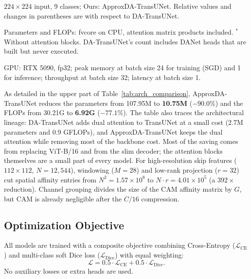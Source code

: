 \begin{table}[t]
\begin{tablenotes}
\item $224 \times 224$ input, 9 classes; Ours: ApproxDA-TransUNet. Relative values and changes in parentheses are with respect to DA-TransUNet.
\item Parameters and FLOPs: fvcore on CPU, attention matrix products included. $^{\ast}$Without attention blocks. DA-TransUNet's count includes DANet heads that are built but never executed.
\item GPU: RTX 5090, fp32; peak memory at batch size 24 for training (SGD) and 1 for inference; throughput at batch size 32; latency at batch size 1.
\end{tablenotes}
\end{table}

As detailed in the upper part of Table~\ref{tab:arch_comparison}, ApproxDA-TransUNet reduces the parameters from 107.95M to \textbf{10.75M} ($-90.0\%$) and the FLOPs from 30.21G to \textbf{6.92G} ($-77.1\%$). The table also traces the architectural lineage: DA-TransUNet adds dual attention to TransUNet at a small cost (2.7M parameters and 0.9 GFLOPs), and ApproxDA-TransUNet keeps the dual attention while removing most of the backbone cost. Most of the saving comes from replacing ViT-B/16 and from the slim decoder; the attention blocks themselves are a small part of every model. For high-resolution skip features ($112 \times 112$, $N = 12{,}544$), windowing ($M=28$) and low-rank projection ($r=32$) cut spatial affinity entries from $N^2 = 1.57 \times 10^8$ to $N \cdot r = 4.01 \times 10^5$ (a $392\times$ reduction). Channel grouping divides the size of the CAM affinity matrix by $G$, but CAM is already negligible after the $C/16$ compression.

\subsection{Optimization Objective}
All models are trained with a composite objective combining Cross-Entropy ($\mathcal{L}_{\text{CE}}$) and multi-class soft Dice loss ($\mathcal{L}_{\text{Dice}}$) with equal weighting:
\begin{equation}
    \mathcal{L} = 0.5 \cdot \mathcal{L}_{\text{CE}} + 0.5 \cdot \mathcal{L}_{\text{Dice}}.
\end{equation}
No auxiliary losses or extra heads are used.
